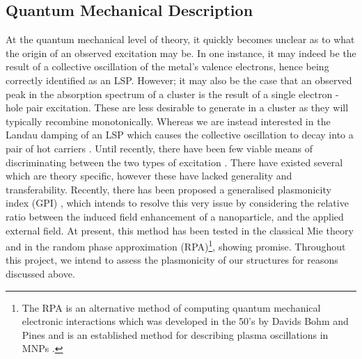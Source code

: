 \subsection{Quantum Mechanical Description}
\label{sec:quant_plasma}

At the quantum mechanical level of theory, it quickly becomes unclear as to what the origin of an observed excitation may be. In one instance, it may indeed be the result of a collective oscillation of the metal's valence electrons, hence being correctly identified as an LSP. However; it may also be the case that an observed peak in the absorption spectrum of a cluster is the result of a single electron - hole pair excitation. These are less desirable to generate in a cluster as they will typically recombine monotonically. Whereas we are instead interested in the Landau damping of an LSP which causes the collective oscillation to decay into a pair of hot carriers \cite{ExtractHotCars}. Until recently, there have been few viable means of discriminating between the two types of excitation \cite{PhotoExcited}. There have existed several which are theory specific, however these have lacked generality and transferability. Recently, there has been proposed a generalised plasmonicity index (GPI) \cite{GPI}, which intends to resolve this very issue by considering the relative ratio between the induced field enhancement of a nanoparticle, and the applied external field. At present, this method has been tested in the classical Mie theory and in the random phase approximation (RPA)\footnote{The RPA is an alternative method of computing quantum mechanical electronic interactions which was developed in the 50's by Davids Bohm and Pines \cite{RPA1,RPA2,RPA3} and is an established method for describing plasma oscillations in MNPs \cite{doi:10.1143/JPSJ.80.044606}.}, showing promise. Throughout this project, we intend to assess the plasmonicity of our structures for reasons discussed above. 

